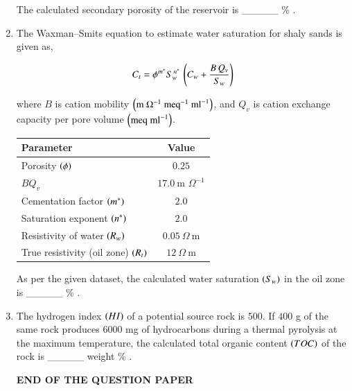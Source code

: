 \documentclass[journal,12pt,onecolumn]{IEEEtran}
\theoremstyle{remark}
\begin{document}
\begin{enumerate}
The calculated secondary porosity of the reservoir is \_\_\_\_\_ \% .

\hfill{}


\item The Waxman--Smits equation to estimate water saturation for shaly sands is given as,

\begin{align*}
C_t = \phi^{m^*} S_w^{\,n^*}\,\left(C_w + \dfrac{B\,Q_v}{S_w}\right)
\end{align*}

where $B$ is cation mobility $\left(\text{m }\Omega^{-1}\ \text{meq}^{-1}\ \text{ml}^{-1}\right)$, and $Q_v$ is cation exchange capacity per pore volume $\left(\text{meq ml}^{-1}\right)$.

\begin{tabular}{|l|c|}
\hline
Parameter & Value \\
\hline
Porosity $\left(\phi\right)$ & $0.25$ \\
$B Q_v$ & $17.0\ \text{m }\Omega^{-1}$ \\
Cementation factor $\left(m^*\right)$ & $2.0$ \\
Saturation exponent $\left(n^*\right)$ & $2.0$ \\
Resistivity of water $\left(R_w\right)$ & $0.05\ \Omega\ \text{m}$ \\
True resistivity (oil zone) $\left(R_t\right)$ & $12\ \Omega\ \text{m}$ \\
\hline
\end{tabular}

As per the given dataset, the calculated water saturation $\left(S_w\right)$ in the oil zone is \_\_\_\_\_ \% .

\hfill{}

\item The hydrogen index $\left(HI\right)$ of a potential source rock is $500$. If $400$ g of the same rock produces $6000$ mg of hydrocarbons during a thermal pyrolysis at the maximum temperature, the calculated total organic content $\left(TOC\right)$ of the rock is \_\_\_\_\_ weight \% .

\hfill{}

\begin{center}
	{\LARGE \textbf{END OF THE QUESTION PAPER}}
\end{center}

\end{enumerate}
\end{document}
